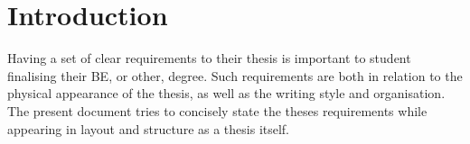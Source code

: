 \chapter{Introduction}\label{ch:intro}

Having a set of clear requirements to their thesis is important to student
finalising their BE, or other, degree.  Such requirements are both in
relation to the physical appearance of the thesis, as well as the writing
style and organisation.  The present document tries to concisely state the
theses requirements while appearing in layout and structure as a thesis
itself.


